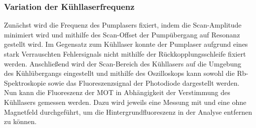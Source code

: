 \documentclass[11pt, a4paper]{article}
\numberwithin{equation}{section}
\begin{document}
\subsubsection{Variation der Kühllaserfrequenz}
Zunächst wird die Frequenz des Pumplasers fixiert, indem die Scan-Amplitude minimiert wird und mithilfe des Scan-Offset der Pumpübergang auf Resonanz gestellt wird.
Im Gegensatz zum Kühllaser konnte der Pumplaser aufgrund eines stark Verrauschten Fehlersignals nicht mithilfe der Rückkopplungsschleife fixiert werden.
Anschließend wird der Scan-Bereich des Kühllasers auf die Umgebung des Kühlübergangs eingestellt und mithilfe des Oszilloskops kann sowohl die Rb-Spektroskopie sowie das Fluoreszenzsignal der Photodiode dargestellt werden.
Nun kann die Fluoreszenz der MOT in Abhängigkeit der Verstimmung des Kühllasers gemessen werden.
Dazu wird jeweils eine Messung mit und eine ohne Magnetfeld durchgeführt, um die Hintergrundfluoreszenz in der Analyse entfernen zu können.
\end{document}

